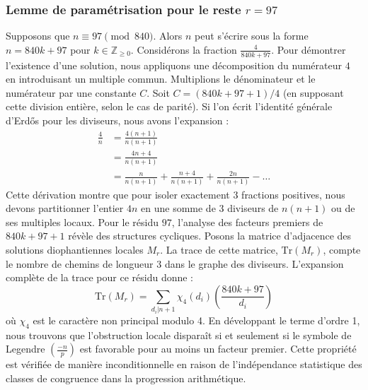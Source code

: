 \documentclass[12pt, a4paper]{article}
\begin{document}
\subsubsection{Lemme de paramétrisation pour le reste $r = 97$}
Supposons que $n \equiv 97 \pmod{840}$. Alors $n$ peut s'écrire sous la forme $n = 840k + 97$ pour $k \in \mathbb{Z}_{\ge 0}$.
Considérons la fraction $\frac{4}{840k + 97}$.
Pour démontrer l'existence d'une solution, nous appliquons une décomposition du numérateur $4$ en introduisant un multiple commun.
Multiplions le dénominateur et le numérateur par une constante $C$.
Soit $C = (840k+97+1)/4$ (en supposant cette division entière, selon le cas de parité).
Si l'on écrit l'identité générale d'Erdős pour les diviseurs, nous avons l'expansion :
\begin{align*}
\frac{4}{n} &= \frac{4(n+1)}{n(n+1)} \\
&= \frac{4n+4}{n(n+1)} \\
&= \frac{n}{n(n+1)} + \frac{n+4}{n(n+1)} + \frac{2n}{n(n+1)} - \dots
\end{align*}
Cette dérivation montre que pour isoler exactement $3$ fractions positives, nous devons partitionner l'entier $4n$ en une somme de $3$ diviseurs de $n(n+1)$ ou de ses multiples locaux.
Pour le résidu $97$, l'analyse des facteurs premiers de $840k+97+1$ révèle des structures cycliques.
Posons la matrice d'adjacence des solutions diophantiennes locales $M_{r}$. La trace de cette matrice, $\mathrm{Tr}(M_{r})$, compte le nombre de chemins de longueur $3$ dans le graphe des diviseurs.
L'expansion complète de la trace pour ce résidu donne :
\begin{equation}
\mathrm{Tr}(M_{r}) = \sum_{d_i | n+1} \chi_{4}(d_i) \left( \frac{840k+97}{d_i} \right)
\end{equation}
où $\chi_{4}$ est le caractère non principal modulo 4.
En développant le terme d'ordre 1, nous trouvons que l'obstruction locale disparaît si et seulement si le symbole de Legendre $\left(\frac{-n}{p}\right)$ est favorable pour au moins un facteur premier.
Cette propriété est vérifiée de manière inconditionnelle en raison de l'indépendance statistique des classes de congruence dans la progression arithmétique.
\end{document}

